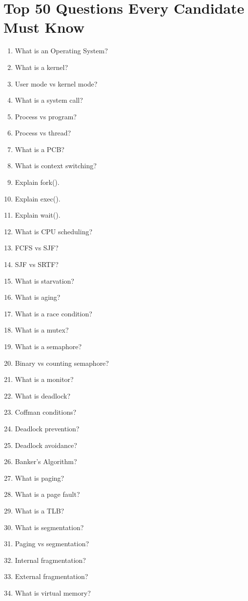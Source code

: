 \newpage

\section{Top 50 Questions Every Candidate Must Know}

\begin{enumerate}
\item What is an Operating System?
\item What is a kernel?
\item User mode vs kernel mode?
\item What is a system call?
\item Process vs program?
\item Process vs thread?
\item What is a PCB?
\item What is context switching?
\item Explain fork().
\item Explain exec().
\item Explain wait().
\item What is CPU scheduling?
\item FCFS vs SJF?
\item SJF vs SRTF?
\item What is starvation?
\item What is aging?
\item What is a race condition?
\item What is a mutex?
\item What is a semaphore?
\item Binary vs counting semaphore?
\item What is a monitor?
\item What is deadlock?
\item Coffman conditions?
\item Deadlock prevention?
\item Deadlock avoidance?
\item Banker's Algorithm?
\item What is paging?
\item What is a page fault?
\item What is a TLB?
\item What is segmentation?
\item Paging vs segmentation?
\item Internal fragmentation?
\item External fragmentation?
\item What is virtual memory?

\end{enumerate}
